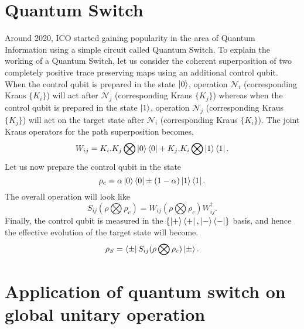 \section{Quantum Switch}
 Around 2020, ICO started gaining popularity in the area of Quantum Information using a simple circuit called Quantum Switch.
To explain the working of a Quantum Switch, let us consider the coherent superposition of two completely positive trace preserving maps using an additional control qubit. When the control qubit is prepared in the state $\ket{0}$, operation $\mathcal{N}_i$ (corresponding Kraus $\lbrace K_i \rbrace$) will act after $\mathcal{N}_j$ (corresponding Kraus $\lbrace K_j \rbrace$) whereas when the control qubit is prepared in the state $\ket{1}$, operation $\mathcal{N}_j$ (corresponding Kraus $\lbrace K_j \rbrace$) will act on the target state after $\mathcal{N}_i$ (corresponding Kraus $\lbrace K_i \rbrace$). The joint Kraus operators for the path superposition becomes,
\begin{equation}
    W_{ij} = K_i.K_j \bigotimes \ket{0} \bra{0} + K_j.K_i \bigotimes \ket{1}\bra{1}.
\end{equation}
Let us now prepare the control qubit in the state
\begin{equation}
    \rho_c = \alpha\ket{0}\bra{0} \pm (1-\alpha) \ket{1}\bra{1}.
\end{equation}
The overall operation will look like
\begin{equation}
    S_{ij}(\rho \bigotimes \rho_c) = W_{ij} (\rho \bigotimes \rho_c) W_{ij}^\dagger.
\end{equation}
Finally, the control qubit is measured in the $\lbrace \ket{+}\bra{+}, \ket{-}\bra{-} \rbrace$ basis, and hence the effective evolution of the target state will become.
\begin{equation}
    \rho_{S} = \bra{\pm} S_{ij}(\rho \bigotimes \rho_c) \ket{\pm}.
\end{equation}

\section{Application of quantum switch on global unitary operation}

